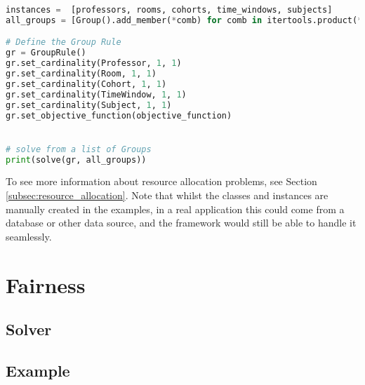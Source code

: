 \begin{lstlisting}[language=Python, caption={Creating and solving the Timetable Scheduling Problem using this framework.}, label={script:time_table}]
instances =  [professors, rooms, cohorts, time_windows, subjects]
all_groups = [Group().add_member(*comb) for comb in itertools.product(*instances)]

# Define the Group Rule
gr = GroupRule()
gr.set_cardinality(Professor, 1, 1)
gr.set_cardinality(Room, 1, 1)
gr.set_cardinality(Cohort, 1, 1)
gr.set_cardinality(TimeWindow, 1, 1)
gr.set_cardinality(Subject, 1, 1)
gr.set_objective_function(objective_function)


# solve from a list of Groups
print(solve(gr, all_groups))
\end{lstlisting}

To see more information about resource allocation problems, see Section \ref{subsec:resource_allocation}.
Note that whilst the classes and instances are manually created in the examples, in a real application this could come from a database or other data source, and the framework would still be able to handle it seamlessly.


\section{Fairness}

\subsection{Solver}
\subsection{Example}